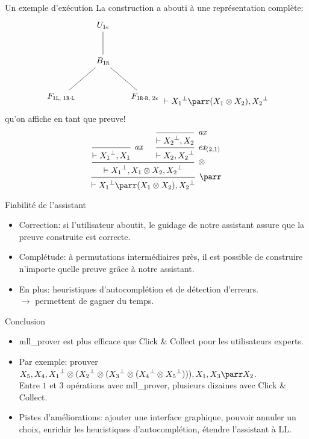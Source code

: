 \documentclass{beamer}
\newcommand*{\orth}{^\perp}
\newcommand*{\tensor}{\otimes}
\newcommand*{\axv}[1]{\infer{0}[\ensuremath{\mathit{ax}}]{\vdash #1}}
\newcommand*{\tensorv}[1]{\infer{2}[\ensuremath{\tensor}]{\vdash #1}}
\newcommand*{\parrv}[1]{\infer{1}[\ensuremath{\parr}]{\vdash #1}}
\newcommand*{\permv}[2]{\infer{1}[\ensuremath{\textit{ex}_{#1}}]{\vdash #2}}
\newcommand*{\Left}{\textnormal{\texttt{L}}}
\newcommand*{\Right}{\textnormal{\texttt{R}}}
\begin{document}
\begin{frame}{Un exemple d'exécution}
    La construction a abouti à une représentation complète:
    \begin{equation*}
        \begin{tikzpicture}%
            [level 2/.style={sibling distance=3.5cm}]
            \node {$U_{1 \epsilon}$}
            child {node {$B_{1 \Right}$}
                child {node {$F_{1 \Left, \; 1 \Right \cdot \Left}$}}
                child {node {$F_{1 \Right \cdot \Right, \; 2 \epsilon}$}}
            };
        \end{tikzpicture}
        \vdash {X_1}\orth \parr (X_1 \tensor X_2), {X_2}\orth
    \end{equation*}
    \pause qu'on affiche en tant que preuve!
    \begin{equation*}
        \begin{prooftree}
            \axv{{X_1}\orth, X_1}
            \axv{{X_2}\orth, X_2}
            \permv{(2, 1)}{X_2, {X_2}\orth}
            \tensorv{{X_1}\orth, X_1 \tensor X_2, {X_2}\orth}
            \parrv{{X_1}\orth \parr (X_1 \tensor X_2), {X_2}\orth}
        \end{prooftree}
    \end{equation*}
\end{frame}

\begin{frame}{Fiabilité de l'assistant}
    \begin{itemize}
        \item Correction: \pause si l'utilisateur aboutit, le guidage de notre assistant assure que la preuve construite est correcte.
            \pause
        \item Complétude: \pause à permutations intermédiaires près, il est possible de construire n'importe quelle preuve grâce à notre assistant.
            \pause
        \item En plus: \pause heuristiques d'autocomplétion et de détection d'erreurs.\\
        $\rightarrow$ permettent de gagner du temps.
    \end{itemize}
\end{frame}

\begin{frame}{Conclusion}
    \begin{itemize}
        \item mll\_prover est plus efficace que Click \& Collect pour les utilisateurs experts.
            \pause
        \item Par exemple: prouver $X_5, X_4, {X_1}\orth \tensor ({X_2}\orth \tensor ({X_3}\orth \tensor ({X_4}\orth \tensor {X_5}\orth))), X_1, X_3 \parr X_2$.\\
        Entre $1$ et $3$ opérations avec mll\_prover, plusieurs dizaines avec Click \& Collect.
            \pause
        \item Pistes d'améliorations: ajouter une interface graphique\pause, pouvoir annuler un choix\pause, enrichir les heuristiques d'autocomplétion\pause, étendre l'assistant à LL.
    \end{itemize}
\end{frame}
\end{document}
